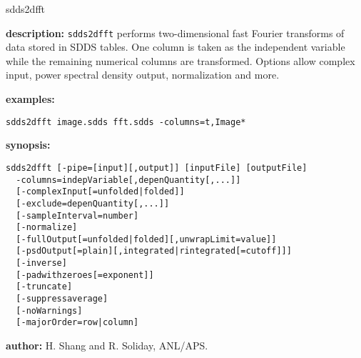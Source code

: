 \newpage
\begin{sddsprog}{sdds2dfft}
  \item \textbf{description:} {\tt sdds2dfft} performs two-dimensional fast Fourier transforms of data stored in SDDS tables. One column is taken as the independent variable while the remaining numerical columns are transformed. Options allow complex input, power spectral density output, normalization and more.
  \item \textbf{examples:}
    \begin{verbatim}
sdds2dfft image.sdds fft.sdds -columns=t,Image*
    \end{verbatim}
  \item \textbf{synopsis:}
    \begin{verbatim}
sdds2dfft [-pipe=[input][,output]] [inputFile] [outputFile]
  -columns=indepVariable[,depenQuantity[,...]]
  [-complexInput[=unfolded|folded]]
  [-exclude=depenQuantity[,...]]
  [-sampleInterval=number]
  [-normalize]
  [-fullOutput[=unfolded|folded][,unwrapLimit=value]]
  [-psdOutput[=plain][,integrated|rintegrated[=cutoff]]]
  [-inverse]
  [-padwithzeroes[=exponent]]
  [-truncate]
  [-suppressaverage]
  [-noWarnings]
  [-majorOrder=row|column]
    \end{verbatim}
  \item \textbf{author:} H. Shang and R. Soliday, ANL/APS.
\end{sddsprog}

